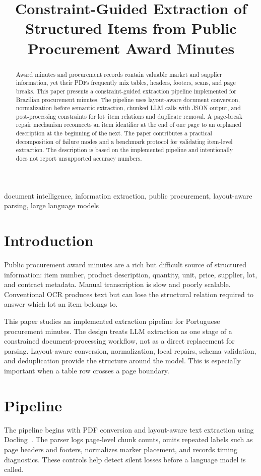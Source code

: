 \documentclass[conference]{IEEEtran}
\title{Constraint-Guided Extraction of Structured Items from Public Procurement Award Minutes}
\author{\IEEEauthorblockN{Anonymous Author}
\IEEEauthorblockA{AI Engineering Practice\\
Replace with author name, affiliation, city, country, and email before submission}}
\begin{document}
\maketitle
\begin{abstract}
Award minutes and procurement records contain valuable market and supplier information, yet their PDFs frequently mix tables, headers, footers, scans, and page breaks. This paper presents a constraint-guided extraction pipeline implemented for Brazilian procurement minutes. The pipeline uses layout-aware document conversion, normalization before semantic extraction, chunked LLM calls with JSON output, and post-processing constraints for lot--item relations and duplicate removal. A page-break repair mechanism reconnects an item identifier at the end of one page to an orphaned description at the beginning of the next. The paper contributes a practical decomposition of failure modes and a benchmark protocol for validating item-level extraction. The description is based on the implemented pipeline and intentionally does not report unsupported accuracy numbers.
\end{abstract}
\begin{IEEEkeywords}
document intelligence, information extraction, public procurement, layout-aware parsing, large language models
\end{IEEEkeywords}

\section{Introduction}
Public procurement award minutes are a rich but difficult source of structured information: item number, product description, quantity, unit, price, supplier, lot, and contract metadata. Manual transcription is slow and poorly scalable. Conventional OCR produces text but can lose the structural relation required to answer which lot an item belongs to.

This paper studies an implemented extraction pipeline for Portuguese procurement minutes. The design treats LLM extraction as one stage of a constrained document-processing workflow, not as a direct replacement for parsing. Layout-aware conversion, normalization, local repairs, schema validation, and deduplication provide the structure around the model. This is especially important when a table row crosses a page boundary.

\section{Pipeline}
The pipeline begins with PDF conversion and layout-aware text extraction using Docling~\cite{deep2025docling}. The parser logs page-level chunk counts, omits repeated labels such as page headers and footers, normalizes marker placement, and records timing diagnostics. These controls help detect silent losses before a language model is called.
\end{document}
